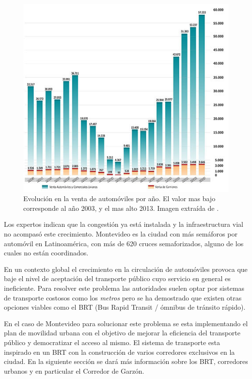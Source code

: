 \begin{figure}[H]
	\centering
	\includegraphics[width=0.9\linewidth]{Figures/ventas_autos}
	\caption{Evolución en la venta de automóviles por año. El valor mas bajo corresponde al año 2003, y el mas alto 2013. Imagen extraída de \citet{Autoanuario2014}.	
	}
	\label{fig:ventas_autos}
\end{figure}


Los expertos indican que la congestión ya está instalada y la infraestructura vial no acompasó este crecimiento. Montevideo es la ciudad con más semáforos por automóvil en Latinoamérica, con más de 620 cruces semaforizados, alguno de los cuales no están coordinados.\citep{Subrayado2013}

En un contexto global el crecimiento en la circulación de automóviles provoca que baje el nivel de aceptación del transporte público cuyo servicio en general es ineficiente. Para resolver este problema las autoridades suelen optar por sistemas de transporte costosos como los \emph{metros} pero se ha demostrado que existen otras opciones viables como el BRT (Bus Rapid Transit / ómnibus de tránsito rápido)\citep{BRT_Dial}.

En el caso de Montevideo para solucionar este problema se esta implementando el plan de movilidad urbana \citep{PlanMovilidad} con el objetivo de mejorar la eficiencia del transporte público y democratizar el acceso al mismo. El sistema de transporte esta inspirado en un BRT con la construcción de varios corredores exclusivos en la ciudad. En la siguiente sección se dará más información sobre los BRT, corredores urbanos y en particular el Corredor de Garzón.




